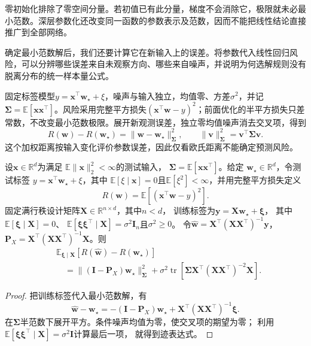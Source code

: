 零初始化排除了零空间分量。若初值已有此分量，梯度不会消除它，极限就未必最小范数。深层参数化还改变同一函数的参数表示及范数，因而不能把线性结论直接推广到全部网络。

确定最小范数解后，我们还要计算它在新输入上的误差。将参数代入线性回归风险，可以分辨哪些误差来自未观察方向、哪些来自噪声，并说明为何选解规则没有脱离分布的统一样本量公式。

固定标签模型$y=\bm x^\top\bm w_\star+\xi$，噪声与输入独立，均值零、方差$\sigma^2$，并记$\bm\Sigma=\mathbb E[\bm x\bm x^\top]$。风险采用完整平方损失$(\bm x^\top\bm w-y)^2$；前面优化的半平方损失只差常数，不改变最小范数极限。展开新观测误差，独立零均值噪声消去交叉项，得到
\[
 R(\bm w)-R(\bm w_\star)
 =\|\bm w-\bm w_\star\|_{\bm\Sigma}^2,
 \qquad\|\bm v\|_{\bm\Sigma}^2=\bm v^\top\bm\Sigma\bm v.
\]
这个加权距离按输入变化评价参数误差，因此仅看欧氏距离不能确定预测风险。

\begin{theorem}[基于最小范数的回归期望风险]
\label{thm:minimum-norm-risk-decomposition}
设$\bm x\in\mathbb R^d$为满足
$\mathbb E\|\bm x\|_2^2<\infty$的测试输入，
$\bm\Sigma=\mathbb E[\bm x\bm x^\top]$。给定
$\bm w_\star\in\mathbb R^d$，令测试标签
$y=\bm x^\top\bm w_\star+\xi$，其中
$\mathbb E[\xi\mid\bm x]=0$且$\mathbb E[\xi^2]<\infty$，并用完整平方损失定义
\[
 R(\bm w)=\mathbb E[(\bm x^\top\bm w-y)^2].
\]
固定满行秩设计矩阵$\bm X\in\mathbb R^{n\times d}$，其中$n<d$，
训练标签为$\bm y=\bm X\bm w_\star+\bm\xi$，
其中$\mathbb E[\bm\xi\mid\bm X]=0$、
$\mathbb E[\bm\xi\bm\xi^\top\mid\bm X]=\sigma^2\bm I_n$且$\sigma^2\geq0$。
令$\hat{\bm w}=\bm X^\top(\bm X\bm X^\top)^{-1}\bm y$，
$\bm P_X=\bm X^\top(\bm X\bm X^\top)^{-1}\bm X$。则
\begin{equation}
 \begin{aligned}
 &\mathbb E_{\bm\xi\mid\bm X}
       [R(\hat{\bm w})-R(\bm w_\star)]\\
 &\quad=\|(\bm I-\bm P_X)\bm w_\star\|_{\bm\Sigma}^2
 +\sigma^2\operatorname{tr}\left[
 \bm\Sigma\bm X^\top(\bm X\bm X^\top)^{-2}\bm X\right].
 \end{aligned}
 \label{eq:minimum-norm-prediction-risk}
\end{equation}
\end{theorem}
\begin{proof}
把训练标签代入最小范数解，有
\[
 \hat{\bm w}-\bm w_\star
 =-(\bm I-\bm P_X)\bm w_\star
   +\bm X^\top(\bm X\bm X^\top)^{-1}\bm\xi.
\]
在$\bm\Sigma$半范数下展开平方。条件噪声均值为零，使交叉项的期望为零；
利用$\mathbb E[\bm\xi\bm\xi^\top\mid\bm X]=\sigma^2\bm I$计算最后一项，
就得到迹表达式。
\end{proof}

